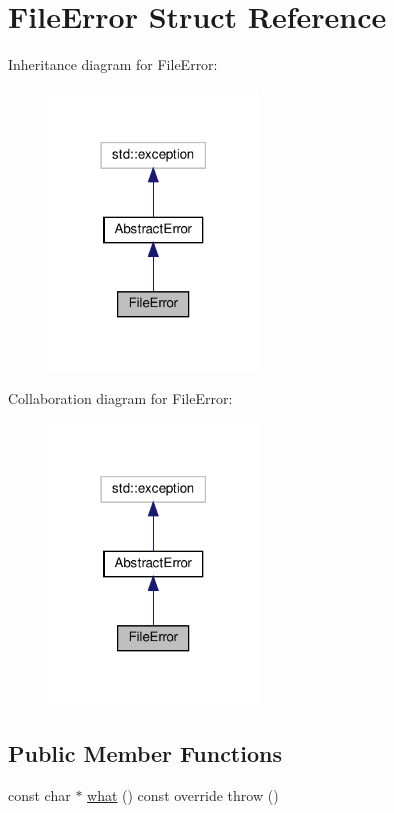 \hypertarget{structFileError}{}\section{File\+Error Struct Reference}
\label{structFileError}


Inheritance diagram for File\+Error\+:\nopagebreak
\begin{figure}[H]
\begin{center}
\leavevmode
\includegraphics[width=158pt]{structFileError__inherit__graph}
\end{center}
\end{figure}


Collaboration diagram for File\+Error\+:\nopagebreak
\begin{figure}[H]
\begin{center}
\leavevmode
\includegraphics[width=158pt]{structFileError__coll__graph}
\end{center}
\end{figure}
\subsection*{Public Member Functions}
\begin{DoxyCompactItemize}
\item 
const char $\ast$ \hyperlink{structFileError_a7446417295daef00459e8d7e16cbb151}{what} () const override  throw ()
\end{DoxyCompactItemize}


